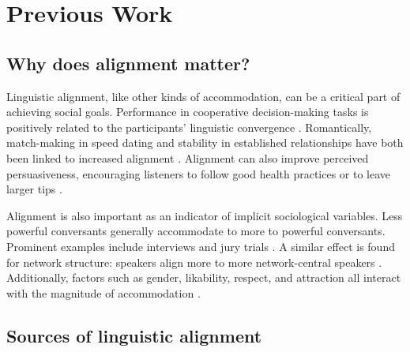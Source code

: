 \documentclass[11pt]{article}
\begin{document}


\section{Previous Work}

\subsection{Why does alignment matter?}

Linguistic alignment, like other kinds of accommodation, can be a critical part of achieving social goals.  Performance in cooperative decision-making tasks is  positively related to the participants' linguistic convergence \cite{FusaroliEtAl2012,KacewiczEtAl2013}.  Romantically, match-making in speed dating and stability in established relationships have both been linked to increased alignment \cite{IrelandEtAl2011}. Alignment can also improve perceived persuasiveness, encouraging listeners to follow good health practices \cite{KlineCeropski1984} or to leave larger tips \cite{vanBaarenEtAl2003}.

Alignment is also important as an indicator of implicit sociological variables. Less powerful conversants generally accommodate to more to powerful conversants. Prominent examples include interviews and jury trials \cite{WillemynsEtAl1997,Gnisci2005,DNMEtAl2012}.  A similar effect is found for network structure: speakers align more to more network-central speakers \cite{NobleFernandez2015}.  Additionally, factors such as gender, likability, respect, and attraction all interact with the magnitude of accommodation \cite{BilousKrauss1988,Natale1975}.

\subsection{Sources of linguistic alignment}
\end{document}
